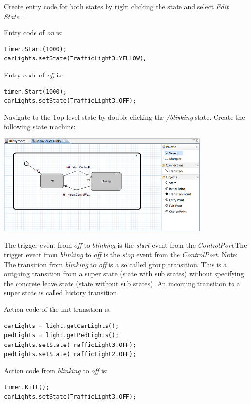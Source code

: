 Create entry code for both states by right clicking the state and select \textit{Edit State...}

Entry code of \textit{on} is:

\begin{verbatim}
timer.Start(1000);
carLights.setState(TrafficLight3.YELLOW); 
\end{verbatim}

 
Entry code  of \textit{off} is:

\begin{verbatim}
timer.Start(1000);
carLights.setState(TrafficLight3.OFF);
\end{verbatim}

Navigate to the Top level state by double clicking the \textit{/blinking} state. Create the following state machine:

\includegraphics[width=0.8\textwidth]{images/020-Blinky15.png}

The trigger event from \textit{off} to \textit{blinking} is the \textit{start} event from the \textit{ControlPort}.The trigger event from \textit{blinking} to \textit{off} is the \textit{stop} event from the \textit{ControlPort}.
Note: The transition from \textit{blinking} to \textit{off} is a so called group transition. This is a outgoing transition from a super state (state with sub states) without specifying the concrete leave state (state without sub states). An incoming transition to a super state is called history transition.   

Action code of the init transition is:

\begin{verbatim}
carLights = light.getCarLights();
pedLights = light.getPedLights();
carLights.setState(TrafficLight3.OFF);
pedLights.setState(TrafficLight2.OFF);
\end{verbatim}

Action code from \textit{blinking} to \textit{off} is:

\begin{verbatim}
timer.Kill();
carLights.setState(TrafficLight3.OFF); 
\end{verbatim}

